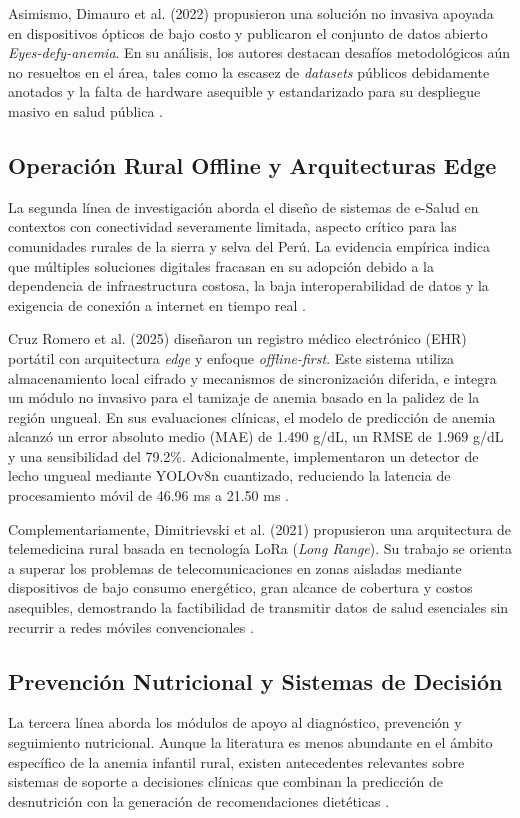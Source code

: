 Asimismo, Dimauro et al. (2022) \cite{dimauro2022} propusieron una solución no invasiva apoyada en dispositivos ópticos de bajo costo y publicaron el conjunto de datos abierto \textit{Eyes-defy-anemia}. En su análisis, los autores destacan desafíos metodológicos aún no resueltos en el área, tales como la escasez de \textit{datasets} públicos debidamente anotados y la falta de hardware asequible y estandarizado para su despliegue masivo en salud pública \cite{dimauro2022}.

\subsection{Operación Rural Offline y Arquitecturas Edge}
La segunda línea de investigación aborda el diseño de sistemas de e-Salud en contextos con conectividad severamente limitada, aspecto crítico para las comunidades rurales de la sierra y selva del Perú. La evidencia empírica indica que múltiples soluciones digitales fracasan en su adopción debido a la dependencia de infraestructura costosa, la baja interoperabilidad de datos y la exigencia de conexión a internet en tiempo real \cite{cruzromero2025, dimitrievski2021}.

Cruz Romero et al. (2025) \cite{cruzromero2025} diseñaron un registro médico electrónico (EHR) portátil con arquitectura \textit{edge} y enfoque \textit{offline-first}. Este sistema utiliza almacenamiento local cifrado y mecanismos de sincronización diferida, e integra un módulo no invasivo para el tamizaje de anemia basado en la palidez de la región ungueal. En sus evaluaciones clínicas, el modelo de predicción de anemia alcanzó un error absoluto medio (MAE) de 1.490 g/dL, un RMSE de 1.969 g/dL y una sensibilidad del 79.2\%. Adicionalmente, implementaron un detector de lecho ungueal mediante YOLOv8n cuantizado, reduciendo la latencia de procesamiento móvil de 46.96 ms a 21.50 ms \cite{cruzromero2025}.

Complementariamente, Dimitrievski et al. (2021) \cite{dimitrievski2021} propusieron una arquitectura de telemedicina rural basada en tecnología LoRa (\textit{Long Range}). Su trabajo se orienta a superar los problemas de telecomunicaciones en zonas aisladas mediante dispositivos de bajo consumo energético, gran alcance de cobertura y costos asequibles, demostrando la factibilidad de transmitir datos de salud esenciales sin recurrir a redes móviles convencionales \cite{dimitrievski2021}.

\subsection{Prevención Nutricional y Sistemas de Decisión}
La tercera línea aborda los módulos de apoyo al diagnóstico, prevención y seguimiento nutricional. Aunque la literatura es menos abundante en el ámbito específico de la anemia infantil rural, existen antecedentes relevantes sobre sistemas de soporte a decisiones clínicas que combinan la predicción de desnutrición con la generación de recomendaciones dietéticas \cite{maasthi2023}.

